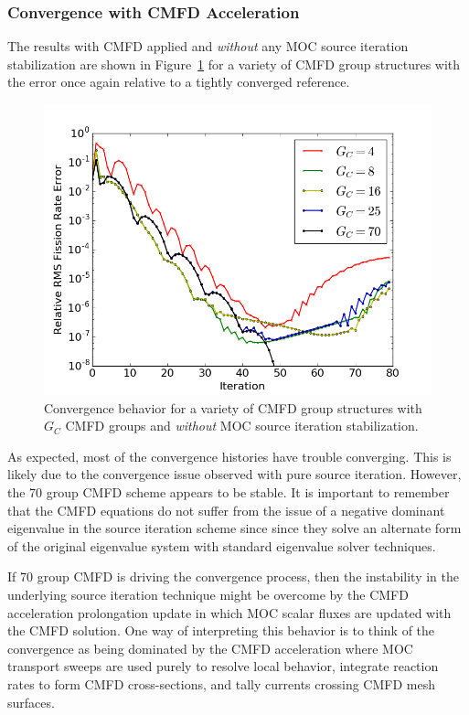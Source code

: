 \subsubsection{Convergence with CMFD Acceleration}

The results with \ac{CMFD} applied and \textit{without} any \ac{MOC} source iteration stabilization are shown in Figure~\ref{fig:sa-cmfd-no-stab} for a variety of \ac{CMFD} group structures with the error once again relative to a tightly converged reference.
\begin{figure}[ht!]
	\centering
	\includegraphics[width=0.65\linewidth]{figures/convergence/sa_no_stab_cmfd.png}
	\caption{Convergence behavior for a variety of \ac{CMFD} group structures with $G_C$ \ac{CMFD} groups and \textit{without} \ac{MOC} source iteration stabilization.}
	\label{fig:sa-cmfd-no-stab}
\end{figure}
As expected, most of the convergence histories have trouble converging. This is likely due to the convergence issue observed with pure source iteration. However, the 70 group \ac{CMFD} scheme appears to be stable. It is important to remember that the \ac{CMFD} equations do not suffer from the issue of a negative dominant eigenvalue in the source iteration scheme since since they solve an alternate form of the original eigenvalue system with standard eigenvalue solver techniques. 

If 70 group \ac{CMFD} is driving the convergence process, then the instability in the underlying source iteration technique might be overcome by the \ac{CMFD} acceleration prolongation update in which \ac{MOC} scalar fluxes are updated with the \ac{CMFD} solution. One way of interpreting this behavior is to think of the convergence as being dominated by the \ac{CMFD} acceleration where \ac{MOC} transport sweeps are used purely to resolve local behavior, integrate reaction rates to form \ac{CMFD} cross-sections, and tally currents crossing \ac{CMFD} mesh surfaces. 

